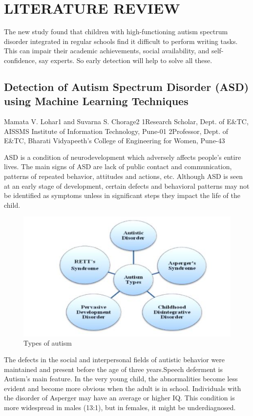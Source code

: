 \chapter{LITERATURE REVIEW}

{\emIn The new study found that children with high-functioning autism spectrum disorder integrated in regular schools find it difficult to perform writing tasks. This can impair their academic achievements, social availability, and self-confidence, say experts. So early detection will help to solve all these.  }


\section{Detection of Autism Spectrum Disorder (ASD) using Machine Learning Techniques}

Mamata V. Lohar1 and Suvarna S. Chorage2 1Research Scholar, Dept. of E&TC, AISSMS Institute of Information Technology, Pune-01 2Professor, Dept. of E&TC, Bharati Vidyapeeth’s College of Engineering for Women, Pune-43 


ASD is a condition of neurodevelopment which adversely affects people's entire lives. The main signs of ASD are lack of public contact and communication, patterns of repeated behavior, attitudes and actions, etc. Although ASD is seen at an early stage of development, certain defects and behavioral patterns may not be identified as symptoms unless in significant steps they impact the life of the child.
\begin{figure}[h]
\label{ss}
\centering
\includegraphics[width=14cm]{Types of autism.JPG}
\caption{Types of autism}
\end{figure}


The defects in the social and interpersonal fields of autistic behavior were maintained and present before the age of three years.Speech deferment is Autism's main feature.  In the very young child, the abnormalities become less evident and become more obvious when the adult is in school. Individuals with the disorder of Asperger may have an average or higher IQ. This condition is more widespread in males (13:1), but in females, it might be underdiagnosed. \\

